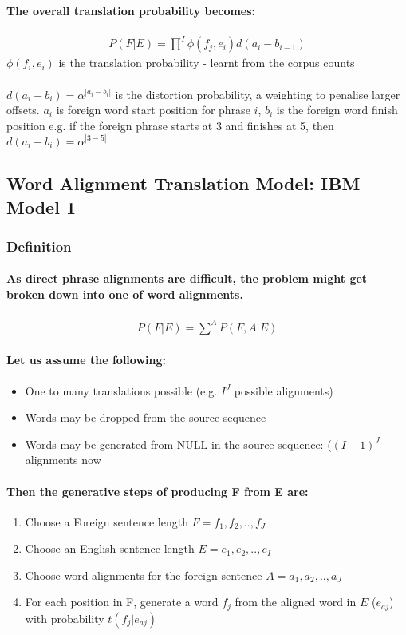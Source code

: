 \documentclass[]{article}
\begin{document}
\paragraph{The overall translation probability becomes:}

\begin{align}
	P(F|E) = \prod^I \phi(f_j, e_i)d(a_i - b_{i-1})
\end{align}
$\phi(f_i, e_i)$ is the translation probability - learnt from the corpus counts \\ \\
$d(a_i - b_i) = \alpha^{|a_i - b_i|}$  is the distortion probability, a weighting to penalise larger offsets. $a_i$ is foreign word start position for phrase $i$, $b_i$ is the foreign word finish position e.g. if the foreign phrase starts at 3 and finishes at 5, then $d(a_i - b_i) = \alpha^{|3 - 5|}$
\newpage
\subsection{Word Alignment Translation Model: IBM Model 1}
\subsubsection{Definition}
\paragraph{As direct phrase alignments are difficult, the problem might get broken down into one of word alignments.}
\begin{align}
	P(F|E) = \sum^A P(F,A|E)
\end{align}
\paragraph{Let us assume the following:}	
	\begin{itemize}
		\item One to many translations possible (e.g. $I^J$ possible alignments)
		\item Words may be dropped from the source sequence
		\item Words may be generated from NULL in the source sequence: ($(I+1)^J$ alignments now
	\end{itemize}
\paragraph{Then the generative steps of producing F from E are:}
\begin{enumerate}
	\item Choose a Foreign sentence length $F=f_1, f_2, .., f_J$
	\item Choose an English sentence length $E=e_1, e_2, .., e_I$
	\item Choose word alignments for the foreign sentence $A=a_1, a_2, .., a_J$
	\item For each position in F, generate a word $f_j$ from the aligned word in $E$ ($e_{aj}$) with probability $t(f_j|e_{aj})$
\end{enumerate}
\end{document}
